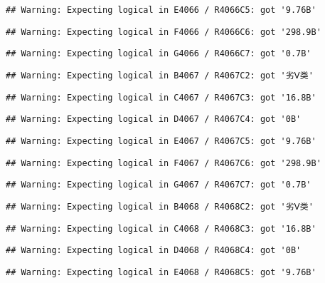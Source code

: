 \documentclass[
]{article}
\begin{document}
\begin{verbatim}
## Warning: Expecting logical in E4066 / R4066C5: got '9.76B'
\end{verbatim}

\begin{verbatim}
## Warning: Expecting logical in F4066 / R4066C6: got '298.9B'
\end{verbatim}

\begin{verbatim}
## Warning: Expecting logical in G4066 / R4066C7: got '0.7B'
\end{verbatim}

\begin{verbatim}
## Warning: Expecting logical in B4067 / R4067C2: got '劣Ⅴ类'
\end{verbatim}

\begin{verbatim}
## Warning: Expecting logical in C4067 / R4067C3: got '16.8B'
\end{verbatim}

\begin{verbatim}
## Warning: Expecting logical in D4067 / R4067C4: got '0B'
\end{verbatim}

\begin{verbatim}
## Warning: Expecting logical in E4067 / R4067C5: got '9.76B'
\end{verbatim}

\begin{verbatim}
## Warning: Expecting logical in F4067 / R4067C6: got '298.9B'
\end{verbatim}

\begin{verbatim}
## Warning: Expecting logical in G4067 / R4067C7: got '0.7B'
\end{verbatim}

\begin{verbatim}
## Warning: Expecting logical in B4068 / R4068C2: got '劣Ⅴ类'
\end{verbatim}

\begin{verbatim}
## Warning: Expecting logical in C4068 / R4068C3: got '16.8B'
\end{verbatim}

\begin{verbatim}
## Warning: Expecting logical in D4068 / R4068C4: got '0B'
\end{verbatim}

\begin{verbatim}
## Warning: Expecting logical in E4068 / R4068C5: got '9.76B'
\end{verbatim}
\end{document}
